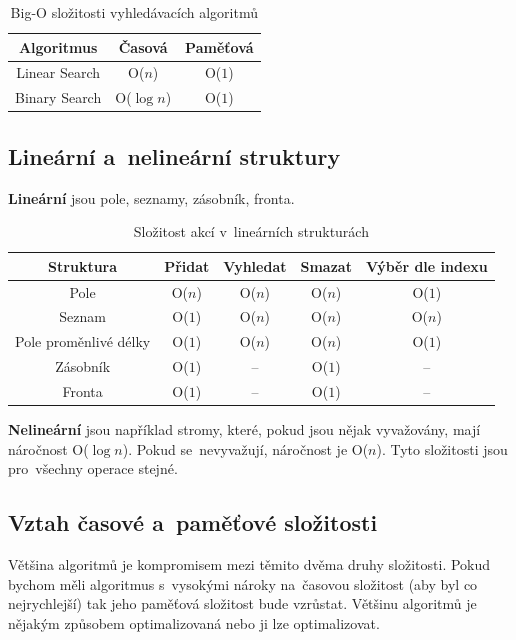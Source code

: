 \begin{table}[h]
	\centering
	\caption{Big-O složitosti vyhledávacích algoritmů}
	\begin{tabular}{|c|c|c|}\hline
		Algoritmus & Časová & Paměťová\\\hline
		Linear Search & O($n$) & O($1$)\\\hline
		Binary Search & O($\log n$) & O($1$)\\\hline
	\end{tabular}
\end{table}

\subsection{Lineární a~nelineární struktury}

\textbf{Lineární} jsou pole, seznamy, zásobník, fronta.

\begin{table}[h]
	\centering
	\caption{Složitost akcí v~lineárních strukturách}
	\begin{tabular}{|c|c|c|c|c|}\hline
		Struktura & Přidat & Vyhledat & Smazat & Výběr dle indexu\\\hline
		Pole & O($n$) & O($n$) & O($n$) & O($1$) \\\hline
		Seznam & O($1$) & O($n$) & O($n$) & O($n$)\\\hline
		Pole proměnlivé délky & O($1$) & O($n$) & O($n$) & O($1$) \\\hline
		Zásobník & O($1$) & -- & O($1$) & -- \\\hline
		Fronta & O($1$) & -- & O($1$) & -- \\\hline
	\end{tabular}
\end{table}

\textbf{Nelineární} jsou například stromy, které, pokud jsou nějak vyvažovány, mají náročnost O($\log{n}$). Pokud se~nevyvažují, náročnost je O($n$). Tyto složitosti jsou pro~všechny operace stejné.

\subsection{Vztah časové a~paměťové složitosti}

Většina algoritmů je kompromisem mezi těmito dvěma druhy složitosti. Pokud bychom měli algoritmus s~vysokými nároky na~časovou složitost (aby byl co nejrychlejší) tak jeho paměťová složitost bude vzrůstat. Většinu algoritmů je nějakým způsobem optimalizovaná nebo ji lze optimalizovat.

